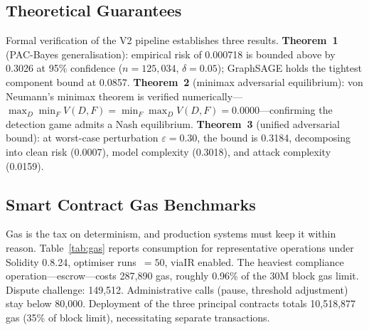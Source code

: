 \documentclass[journal]{IEEEtran}
\begin{document}
\subsection{Theoretical Guarantees}

Formal verification of the V2 pipeline establishes three results. \textbf{Theorem~1} (PAC-Bayes generalisation): empirical risk of 0.000718 is bounded above by 0.3026 at 95\% confidence ($n = 125{,}034$, $\delta = 0.05$); GraphSAGE holds the tightest component bound at 0.0857. \textbf{Theorem~2} (minimax adversarial equilibrium): von Neumann's minimax theorem is verified numerically---$\max_D \min_F V(D, F) = \min_F \max_D V(D, F) = 0.0000$---confirming the detection game admits a Nash equilibrium. \textbf{Theorem~3} (unified adversarial bound): at worst-case perturbation $\varepsilon = 0.30$, the bound is 0.3184, decomposing into clean risk (0.0007), model complexity (0.3018), and attack complexity (0.0159).

\subsection{Smart Contract Gas Benchmarks}

Gas is the tax on determinism, and production systems must keep it within reason. Table~\ref{tab:gas} reports consumption for representative operations under Solidity 0.8.24, optimiser runs~$= 50$, viaIR enabled. The heaviest compliance operation---escrow---costs 287,890 gas, roughly 0.96\% of the 30M block gas limit. Dispute challenge: 149,512. Administrative calls (pause, threshold adjustment) stay below 80,000. Deployment of the three principal contracts totals 10,518,877 gas (35\% of block limit), necessitating separate transactions.
\end{document}
